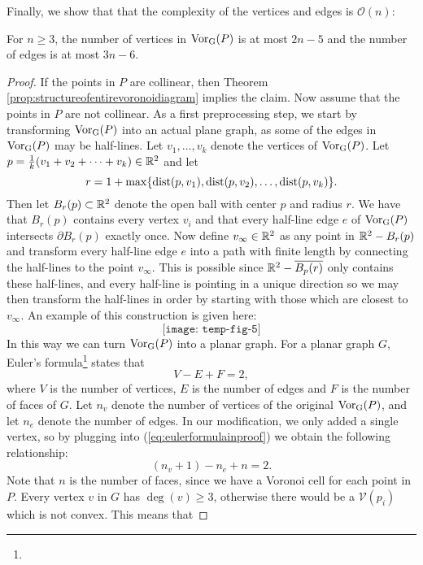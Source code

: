 Finally, we show that that the complexity of the vertices and edges is $\mathcal{O}(n)$:
\begin{thm}
For $n \geq 3$, the number of vertices in $\operatorname{Vor_{G}}(P)$ is at most $2n - 5$ and the number of edges is at most $3n - 6$.
\end{thm}
\begin{proof}
If the points in $P$ are collinear, then Theorem \ref{prop:structureofentirevoronoidiagram} implies the claim. Now assume that the points in $P$ are not collinear. As a first preprocessing step, we start by transforming $\operatorname{Vor_{G}}(P)$ into an actual plane graph, as some of the edges in $\operatorname{Vor_{G}}(P)$ may be half-lines. Let $v_1, \ldots, v_k$ denote the vertices of $\operatorname{Vor_{G}}(P)$. Let $p = \tfrac{1}{k}(v_1 + v_2 + \cdots + v_k) \in \mathbb{R}^2$ and let
\[
    r = 1 + \max\{\operatorname{dist}(p, v_1), \operatorname{dist}(p, v_2), \ldots, \operatorname{dist}(p, v_k)\}.
\]
Then let $B_r(p) \subset \mathbb{R}^2$ denote the open ball with center $p$ and radius $r$. We have that $B_r(p)$ contains every vertex $v_i$ and that every half-line edge $e$ of $\operatorname{Vor_{G}}(P)$ intersects $\partial B_r(p)$ exactly once. Now define $v_{\infty} \in \mathbb{R}^2$ as any point in $\mathbb{R}^2 - B_r(p)$ and transform every half-line edge $e$ into a path with finite length by connecting the half-lines to the point $v_{\infty}$. This is possible since $\mathbb{R}^2 - \overline{B_p(r)}$ only contains these half-lines, and every half-line is pointing in a unique direction so we may then transform the half-lines in order by starting with those which are closest to $v_{\infty}$. An example of this construction is given here:
\[
    \texttt{[image: temp-fig-5]}
\]
In this way we can turn $\operatorname{Vor_{G}}(P)$ into a planar graph. For a planar graph $G$, Euler's formula\footnote{} states that
\begin{equation} \label{eq:eulerformulainproof}
    V - E + F = 2,
\end{equation}
where $V$ is the number of vertices, $E$ is the number of edges and $F$ is the number of faces of $G$. Let $n_v$ denote the number of vertices of the original $\operatorname{Vor_{G}}(P)$, and let $n_e$ denote the number of edges. In our modification, we only added a single vertex, so by plugging into (\ref{eq:eulerformulainproof}) we obtain the following relationship:
\begin{equation} \label{eq:eulersformulaapplied}
    (n_v + 1) - n_e + n = 2.
\end{equation}
Note that $n$ is the number of faces, since we have a Voronoi cell for each point in $P$. Every vertex $v$ in $G$ has $\deg(v) \geq 3$, otherwise there would be a $\mathcal{V}(p_i)$ which is not convex. This means that

\end{proof}
